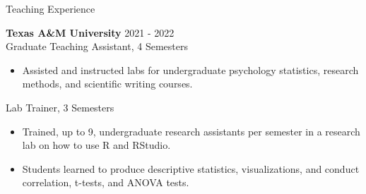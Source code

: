 \documentclass{resume} %
\begin{document}
\begin{rSection}{Teaching Experience}
    
    {\bf {Texas A\&M University}}
    \hfill {2021 - 2022}
    \\Graduate Teaching Assistant, 4 Semesters
    
    \begin{itemize}[nosep]
        
        \item Assisted and instructed labs for undergraduate
        psychology statistics, research methods, and scientific
        writing courses.
        
    \end{itemize}

    Lab Trainer, 3 Semesters
    
    \begin{itemize}[nosep]
        
        \item Trained, up to 9, undergraduate research assistants per 
        semester in a research lab on how to use R and RStudio.
        \item Students learned to produce descriptive statistics, visualizations, and conduct correlation, t-tests, and ANOVA tests.
        
    \end{itemize}
    
\end{rSection}

%


\end{document}
